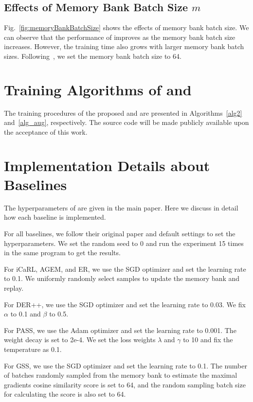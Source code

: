 \subsection{Effects of Memory Bank Batch Size $m$}
Fig.~\ref{fig:memoryBankBatchSize} shows the effects of memory bank batch size. We can observe that the performance of \frameworkName improves as the memory bank batch size increases. 
However, the training time also grows with larger memory bank batch sizes. 
Following~\cite{OCM}, we set the memory bank batch size to 64.




\section{Training Algorithms of \frameworkName and \dataaugname}
\label{appendix:algorithm}
The training procedures of the proposed \frameworkName and \dataaugname are presented in Algorithms~\ref{alg2} and~\ref{alg_aug}, respectively. The source code will be made publicly available upon the acceptance of this work.





\section{Implementation Details about Baselines}
\label{appendix:baselines}

The hyperparameters of \frameworkName are given in the main paper. Here we discuss in detail how each baseline is implemented.

For all baselines, we follow their original paper and default settings to set the hyperparameters. We set the random seed to 0 and run the experiment 15 times in the same program to get the results.

For iCaRL, AGEM, and ER, we use the SGD optimizer and set the learning rate to 0.1. We uniformly randomly select samples to update the memory bank and replay.

For DER++, we use the SGD optimizer and set the learning rate to 0.03. We fix $\alpha$ to 0.1 and $\beta$ to 0.5.

For PASS, we use the Adam optimizer and set the learning rate to 0.001. The weight decay is set to 2e-4. We set the loss weights $\lambda$ and $\gamma$ to 10 and fix the temperature as 0.1.

For GSS, we use the SGD optimizer and set the learning rate to 0.1. The number of batches randomly sampled from the memory bank to estimate the maximal gradients cosine similarity score is set to 64, and the random sampling batch size for calculating the score is also set to 64.

